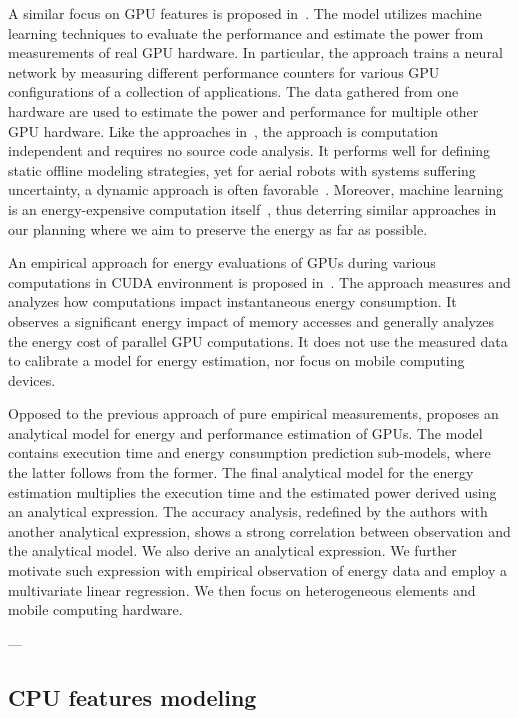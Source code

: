 A similar focus on GPU features is proposed in~\citep{wu2015gpgpu}.  The model utilizes machine learning techniques to evaluate the performance and estimate the power from measurements of real GPU hardware. In particular, the approach trains a neural network by measuring different performance counters for various GPU configurations of a collection of applications. The data gathered from one hardware are used to estimate the power and performance for multiple other GPU hardware. Like the approaches in~, the approach is computation independent and requires no source code analysis. It performs well for defining static offline modeling strategies, yet for aerial robots with systems suffering uncertainty, a dynamic approach is often favorable~\citep{seewald2019coarse}. Moreover, machine learning is an energy-expensive computation itself~\citep{garcia2019estimation,yang2017method}, thus deterring similar approaches in our planning where we aim to preserve the energy as far as possible.

An empirical approach for energy evaluations of GPUs during various computations in CUDA environment is proposed in~\citep{collange2009power}. The approach measures and analyzes how computations impact instantaneous energy consumption. It observes a significant energy impact of memory accesses and generally analyzes the energy cost of parallel GPU computations. It does not use the measured data to calibrate a model for energy estimation, nor focus on mobile computing devices.

Opposed to the previous approach of pure empirical measurements, \citep{luo2011performance} proposes an analytical model for energy and performance estimation of GPUs. The model contains execution time and energy consumption prediction sub-models, where the latter follows from the former. The final analytical model for the energy estimation multiplies the execution time and the estimated power derived using an analytical expression. The accuracy analysis, redefined by the authors with another analytical expression, shows a strong correlation between observation and the analytical model. We also derive an analytical expression. We further motivate such expression with empirical observation of energy data and employ a multivariate linear regression. We then focus on heterogeneous elements and mobile computing hardware.

---


\subsection{CPU features modeling}
\label{sec:soa-cpu}

